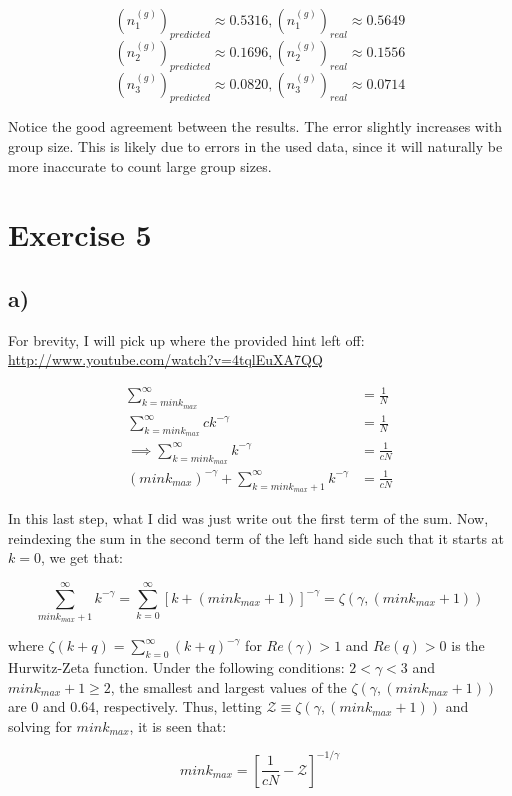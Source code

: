 \documentclass{article}
\begin{document}
\[ (n_1^{(g)})_{predicted} \approx 0.5316 , (n_1^{(g)})_{real} \approx 0.5649 \]
\[ (n_2^{(g)})_{predicted} \approx 0.1696, (n_2^{(g)})_{real} \approx 0.1556\]
\[ (n_3^{(g)})_{predicted} \approx 0.0820, (n_3^{(g)})_{real} \approx 0.0714\] 

Notice the good agreement between the results. The error slightly increases with group size. This is likely due to errors in the used data, since it will naturally be more inaccurate to count large group sizes.

\section{Exercise 5}

\subsection{a)} 

For brevity, I will pick up where the provided hint left off: \url{http://www.youtube.com/watch?v=4tqlEuXA7QQ}

\begin{align}
\sum_{k=mink_{max}}^{\infty} &= \frac{1}{N} \\
\sum_{k=mink_{max}}^{\infty} ck^{-\gamma} &= \frac{1}{N} \\
\implies  \sum_{k=mink_{max}}^{\infty} k^{-\gamma} &= \frac{1}{cN} \\
(mink_{max})^{-\gamma}  + \sum_{k=mink_{max}+1}^{\infty} k^{-\gamma} &= \frac{1}{cN}
\end{align}

In this last step, what I did was just write out the first term of the sum. Now, reindexing the sum in the second term of the left hand side such that it starts at $k = 0$, we get that:

\[ \sum_{mink_{max}+1}^{\infty} k^{-\gamma} = \sum_{k=0}^{\infty} [k+(mink_{max}+1)]^{-\gamma}  = \zeta(\gamma, (mink_{max}+1)) \]

where $\zeta(k+q) = \sum_{k=0}^{\infty} (k+q)^{-\gamma}$ for $Re(\gamma) > 1$ and $Re(q) > 0$ is the Hurwitz-Zeta function. Under the following conditions: $2 < \gamma < 3$ and $mink_{max} + 1 \geq 2$, the smallest and largest values of the $\zeta(\gamma,(mink_{max}+1))$ are 0 and 0.64, respectively. Thus, letting $\mathcal{Z} \equiv \zeta(\gamma,(mink_{max}+1))$ and solving for $mink_{max}$, it is seen that:

\[ mink_{max} = [\frac{1}{cN} - \mathcal{Z}]^{-1/\gamma} \]
\end{document}
